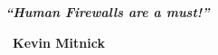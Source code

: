 \documentclass[../../main.tex]{subfiles}
\begin{document}

\thispagestyle{empty}
\centering
\vspace*{10cm}

\large\bfseries\textit {"`Human Firewalls are a must!"'}\par
\normalsize\bfseries\ {Kevin Mitnick}
\end{document}
